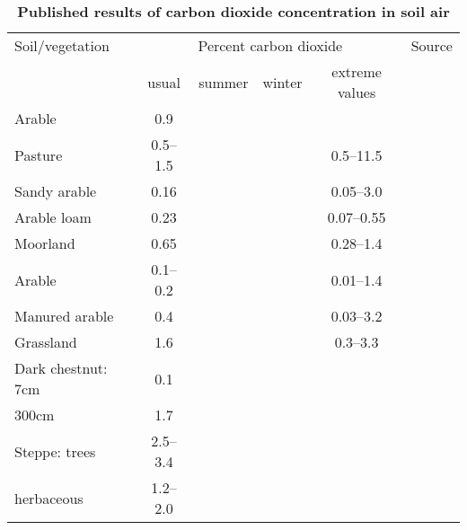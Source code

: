 \begin{table}[ht]
\small\addtolength{\tabcolsep}{-5pt}
\centering
\caption [Published results of carbon dioxide concentration in soil air \cite{white2018karst}] {\textbf{Published results of carbon dioxide concentration in soil air \cite{white2018karst}}}
\begin{tabular}{lccccc}
    \hline
    Soil/vegetation & \multicolumn{4}{c}{Percent carbon dioxide} & Source\\
    \cline{2-5}
    & usual & summer & winter & extreme values &\\
    \hline
    Arable                       & 0.9         &              &              &             & \cite{russell1973soil} \\
    Pasture                      & 0.5--1.5    &              &              & 0.5--11.5   & \cite{russell1973soil} \\
    Sandy arable                 & 0.16        &              &              & 0.05--3.0   & \cite{russell1973soil} \\
    Arable loam                  & 0.23        &              &              & 0.07--0.55  & \cite{russell1973soil} \\
    Moorland                     & 0.65        &              &              & 0.28--1.4   & \cite{russell1973soil} \\
    Arable                       & 0.1--0.2    &              &              & 0.01--1.4   & \cite{russell1973soil} \\
    Manured arable               & 0.4         &              &              & 0.03--3.2   & \cite{russell1973soil} \\
    Grassland                    & 1.6         &              &              & 0.3--3.3    & \cite{russell1973soil} \\
    Dark chestnut: 7cm           & 0.1         &              &              &             & \cite{chulakov1959} \\
    \hspace{27mm} 300cm          & 1.7         &              &              &             & \cite{chulakov1959} \\
    Steppe: trees                & 2.5--3.4    &              &              &             & \cite{matskevitch1957} \\
    \hspace{14mm} herbaceous     & 1.2--2.0    &              &              &             & \cite{matskevitch1957} \\

\end{tabular}
\end{table}
